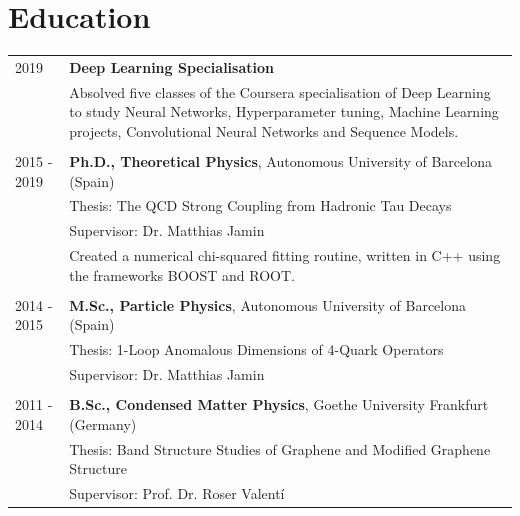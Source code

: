 \documentclass[11pt]{article}
\begin{document}
\begin{tabularx}{\textwidth}{lX}
\end{tabularx}


\section*{Education}
\begin{tabularx}{\textwidth}{sX}
  2019         & \textbf{Deep Learning Specialisation} \\
               & Absolved five classes of the Coursera specialisation of Deep Learning to study Neural Networks,
                 Hyperparameter tuning, Machine Learning projects, Convolutional Neural Networks and Sequence Models. \\\\
  2015 - 2019  & \textbf{Ph.D., Theoretical Physics}, Autonomous University of
                 Barcelona (Spain) \\
               & Thesis: The QCD Strong Coupling from Hadronic Tau
                 Decays \\
               & Supervisor: Dr. Matthias Jamin \\
               & Created a numerical chi-squared fitting routine, written in
                 C++ using the frameworks BOOST and ROOT. \\\\
  2014 - 2015  & \textbf{M.Sc., Particle Physics}, Autonomous University of
                                Barcelona (Spain) \\
               & Thesis: 1-Loop Anomalous Dimensions of 4-Quark
                 Operators \\
               & Supervisor: Dr. Matthias Jamin \\\\
  2011 - 2014  & \textbf{B.Sc., Condensed Matter Physics}, Goethe University Frankfurt (Germany) \\
               & Thesis: Band Structure Studies of Graphene and Modified
                 Graphene Structure \\
               & Supervisor: Prof. Dr. Roser Valentí
\end{tabularx}
		
\end{document}
